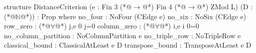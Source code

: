 structure DistanceCriterion (e : Fin 3 (*@$\to$@*) Fin 4 (*@$\to$@*) ZMod L) (D : (*@$\mathbb N$@*)) : Prop where
  no_four : NoFour (CEdge e)
  no_six : NoSix (CEdge e)
  row_zero : (*@$\forall$@*) j,e 0 j=0
  column_zero : (*@$\forall$@*) i,e i 0=0
  no_column_partition : NoColumnPartition e
  no_triple_row : NoTripleRow e
  classical_bound : ClassicalAtLeast e D
  transpose_bound : TransposeAtLeast e D
